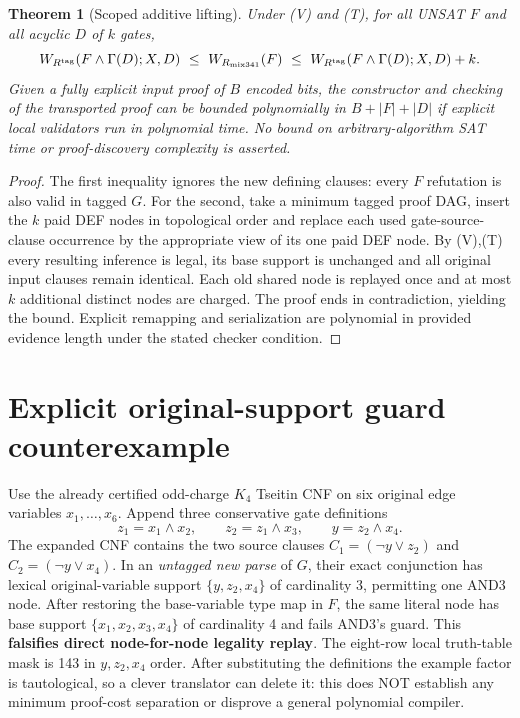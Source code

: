\documentclass[11pt]{article}
\newtheorem{theorem}{Theorem}
\begin{document}
\begin{theorem}[Scoped additive lifting]
Under (V) and (T), for all UNSAT $F$ and all acyclic $D$ of $k$ gates,
\[
W_{R^{\rm tag}}(F\wedge\Gamma(D);X,D)
\ \le\ W_{R_{\rm mix341}}(F)
\ \le\ W_{R^{\rm tag}}(F\wedge\Gamma(D);X,D)+k .
\]
Given a fully explicit input proof of $B$ encoded bits, the constructor and checking of the transported proof can be bounded polynomially in $B+|F|+|D|$ if explicit local validators run in polynomial time. No bound on arbitrary-algorithm SAT time or proof-discovery complexity is asserted.
\end{theorem}
\begin{proof}
The first inequality ignores the new defining clauses: every $F$ refutation is also valid in tagged $G$. For the second, take a minimum tagged proof DAG, insert the $k$ paid DEF nodes in topological order and replace each used gate-source-clause occurrence by the appropriate view of its one paid DEF node. By (V),(T) every resulting inference is legal, its base support is unchanged and all original input clauses remain identical. Each old shared node is replayed once and at most $k$ additional distinct nodes are charged. The proof ends in contradiction, yielding the bound. Explicit remapping and serialization are polynomial in provided evidence length under the stated checker condition.
\end{proof}

\section*{Explicit original-support guard counterexample}
Use the already certified odd-charge $K_4$ Tseitin CNF on six original edge variables $x_1,\ldots,x_6$. Append three conservative gate definitions
\[
z_1=x_1\land x_2,\qquad z_2=z_1\land x_3,\qquad y=z_2\land x_4.
\]
The expanded CNF contains the two source clauses $C_1=(\neg y\lor z_2)$ and $C_2=(\neg y\lor x_4)$. In an \emph{untagged new parse} of $G$, their exact conjunction has lexical original-variable support $\{y,z_2,x_4\}$ of cardinality 3, permitting one AND3 node. After restoring the base-variable type map in $F$, the same literal node has base support $\{x_1,x_2,x_3,x_4\}$ of cardinality 4 and fails AND3's guard. This \textbf{falsifies direct node-for-node legality replay}. The eight-row local truth-table mask is 143 in $y,z_2,x_4$ order. After substituting the definitions the example factor is tautological, so a clever translator can delete it: this does NOT establish any minimum proof-cost separation or disprove a general polynomial compiler.
\end{document}
